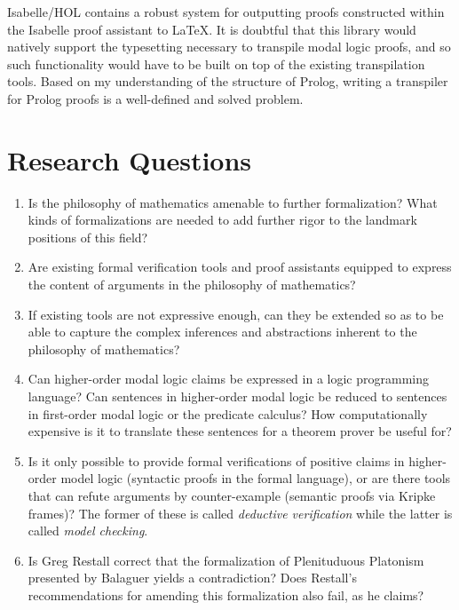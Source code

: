 \documentclass[12pt]{article}
\theoremstyle{definition}
\begin{document}
Isabelle/HOL contains a robust system for outputting proofs constructed within
the Isabelle proof assistant to LaTeX. It is doubtful that this library would
natively support the typesetting necessary to transpile modal logic proofs, and
so such functionality would have to be built on top of the existing
transpilation tools. Based on my understanding of the structure of Prolog,
writing a transpiler for Prolog proofs is a well-defined and solved problem.

\section{Research Questions}

\begin{enumerate}
    \item Is the philosophy of mathematics amenable to further formalization?
        What kinds of formalizations are needed to add further rigor to the
        landmark positions of this field?
    \item Are existing formal verification tools and proof assistants equipped
        to express the content of arguments in the philosophy of mathematics?
    \item If existing tools are not expressive enough, can they be extended so
        as to be able to capture the complex inferences and abstractions
        inherent to the philosophy of mathematics?
    \item Can higher-order modal logic claims be expressed in a logic
        programming language? Can sentences in higher-order modal logic be
        reduced to sentences in first-order modal logic or the predicate
        calculus? How computationally expensive is it to translate these
        sentences for a theorem prover be useful for?
    \item Is it only possible to provide formal verifications of positive
        claims in higher-order model logic (syntactic proofs in the formal
        language), or are there tools that can refute arguments by
        counter-example (semantic proofs via Kripke frames)? The former of
        these is called \textit{deductive verification} while the latter is
        called \textit{model checking}.
    \item Is Greg Restall correct that the formalization of Plenituduous
        Platonism presented by Balaguer yields a contradiction? Does Restall's
        recommendations for amending this formalization also fail, as he claims?
\end{enumerate}
\end{document}
